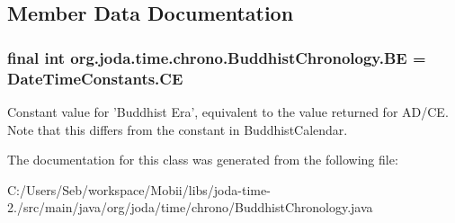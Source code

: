 \subsection{Member Data Documentation}
\hypertarget{classorg_1_1joda_1_1time_1_1chrono_1_1_buddhist_chronology_a120b9b9edd23ae1728db1b85e3ede314}{
\subsubsection[{B\-E}]{\setlength{\rightskip}{0pt plus 5cm}final int org.\-joda.\-time.\-chrono.\-Buddhist\-Chronology.\-B\-E = {\bf Date\-Time\-Constants.\-C\-E}\hspace{0.3cm}{\ttfamily [static]}}}\label{classorg_1_1joda_1_1time_1_1chrono_1_1_buddhist_chronology_a120b9b9edd23ae1728db1b85e3ede314}
Constant value for 'Buddhist Era', equivalent to the value returned for A\-D/\-C\-E. Note that this differs from the constant in Buddhist\-Calendar. 

The documentation for this class was generated from the following file\-:\begin{DoxyCompactItemize}
\item 
C\-:/\-Users/\-Seb/workspace/\-Mobii/libs/joda-\/time-\/2./src/main/java/org/joda/time/chrono/Buddhist\-Chronology.\-java\end{DoxyCompactItemize}
